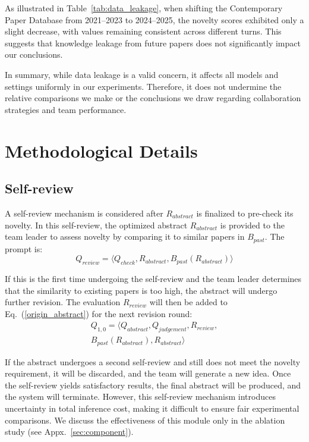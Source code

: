 \documentclass[11pt]{article}
\begin{document}
As illustrated in Table~\ref{tab:data_leakage}, when shifting the Contemporary Paper Database from 2021–2023 to 2024–2025, the novelty scores exhibited only a slight decrease, with values remaining consistent across different turns. This suggests that knowledge leakage from future papers does not significantly impact our conclusions.

In summary, while data leakage is a valid concern, it affects all models and settings uniformly in our experiments. Therefore, it does not undermine the relative comparisons we make or the conclusions we draw regarding collaboration strategies and team performance. 

\section{Methodological Details}
\subsection{Self-review}\label{sec:self_review}
A self-review mechanism is considered after $R_{abstract}$ is finalized to pre-check its novelty. In this self-review, the optimized abstract $R_{abstract}$ is provided to the team leader to assess novelty by comparing it to similar papers in $B_{past}$. The prompt is:
\begin{equation}
    Q_{review}=\langle Q_{check}, R_{abstract}, B_{past}(R_{abstract})\rangle
\end{equation}

If this is the first time undergoing the self-review and the team leader determines that the similarity to existing papers is too high, the abstract will undergo further revision. The evaluation $R_{review}$ will then be added to Eq.~(\ref{origin_abstract}) for the next revision round: 
\begin{equation}
\begin{split}
    Q_{1,0}=\langle Q_{abstract}, Q_{judgement}, R_{review}, \\B_{past}(R_{abstract}),R_{abstract}\rangle
\end{split}
\end{equation}

If the abstract undergoes a second self-review and still does not meet the novelty requirement, it will be discarded, and the team will generate a new idea. Once the self-review yields satisfactory results, the final abstract will be produced, and the system will terminate. However, this self-review mechanism introduces uncertainty in total inference cost, making it difficult to ensure fair experimental comparisons. We discuss the effectiveness of this module only in the ablation study (see Appx.~\ref{sec:component}).
\end{document}
